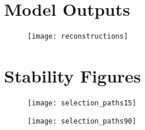 \section{Model Outputs}

\begin{figure}
\texttt{[image: reconstructions]}
\caption{}
\label{fig:reconstructions}
\end{figure}

\section{Stability Figures}

\begin{figure}
  \centering
  \texttt{[image: selection\_paths15]}
  \caption{}
  \label{fig:}
\end{figure}


\begin{figure}
  \centering
  \texttt{[image: selection\_paths90]}
  \caption{}
  \label{fig:}
\end{figure}
